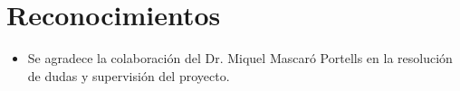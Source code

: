 \section*{Reconocimientos}
\begin{itemize}
    \item Se agradece la colaboración del Dr. Miquel Mascaró Portells en la resolución de dudas y supervisión del proyecto.
\end{itemize}
